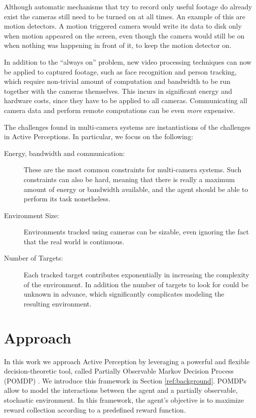 Although automatic mechanisms that try to record only useful footage do already exist the cameras
still need to be turned on at all times. An example of this are motion detectors. A motion triggered
camera would write its data to disk only when motion appeared on the screen, even though the camera
would still be on when nothing was happening in front of it, to keep the motion detector on.

In addition to the ``always on'' problem, new video processing techniques can now be applied to
captured footage, such as face recognition and person tracking, which require non-trivial amount of
computation and bandwidth to be run together with the cameras themselves. This incurs in significant
energy and hardware costs, since they have to be applied to all cameras. Communicating all camera
data and perform remote computations can be even \textit{more} expensive.

The challenges found in multi-camera systems are instantiations of the challenges in Active
Perceptions. In particular, we focus on the following:

\begin{description}
\item[Energy, bandwidth and communication:] These are the most common constraints for multi-camera
    systems. Such constraints can also be hard, meaning that there is really a maximum amount of
    energy or bandwidth available, and the agent should be able to perform its task nonetheless.
\item[Environment Size:] Environments tracked using cameras can be sizable, even ignoring the fact
    that the real world is continuous.
\item[Number of Targets:] Each tracked target contributes exponentially in increasing the complexity
    of the environment. In addition the number of targets to look for could be unknown in advance,
    which significantly complicates modeling the resulting environment.
\end{description}

\section{Approach}

In this work we approach Active Perception by leveraging a powerful and flexible decision-theoretic
tool, called Partially Observable Markov Decision Process (POMDP) \cite{cit:pomdp}. We introduce
this framework in Section \ref{ref:background}. POMDPs allow to model the interactions between the
agent and a partially observable, stochastic environment.  In this framework, the agent's objective
is to maximize reward collection according to a predefined reward function.

